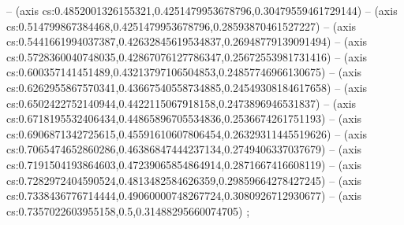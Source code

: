  --  (axis cs:0.4852001326155321,0.4251479953678796,0.30479559461729144)
 --  (axis cs:0.514799867384468,0.4251479953678796,0.28593870461527227)
 --  (axis cs:0.5441661994037387,0.42632845619534837,0.26948779139091494)
 --  (axis cs:0.5728360040748035,0.42867076127786347,0.25672553981731416)
 --  (axis cs:0.600357141451489,0.43213797106504853,0.24857746966130675)
 --  (axis cs:0.6262955867570341,0.43667540558734885,0.24549308184617658)
 --  (axis cs:0.6502422752140944,0.4422115067918158,0.2473896946531837)
 --  (axis cs:0.6718195532406434,0.44865896705534836,0.2536674261751193)
 --  (axis cs:0.6906871342725615,0.45591610607806454,0.26329311445519626)
 --  (axis cs:0.7065474652860286,0.46386847444237134,0.2749406337037679)
 --  (axis cs:0.7191504193864603,0.47239065854864914,0.2871667416608119)
 --  (axis cs:0.7282972404590524,0.4813482584626359,0.29859664278427245)
 --  (axis cs:0.7338436776714444,0.49060000748267724,0.3080926712930677)
 --  (axis cs:0.7357022603955158,0.5,0.31488295660074705)
;
